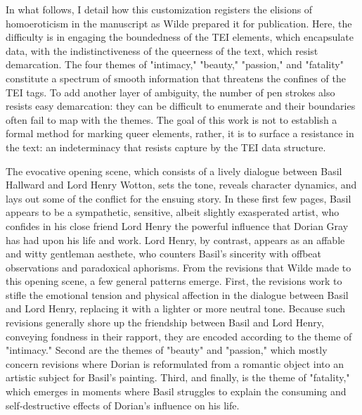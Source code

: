 \documentclass[11pt]{article}
\begin{document}
In what follows, I detail how this customization registers the
elisions of homoeroticism in the manuscript as Wilde prepared it for
publication. Here, the difficulty is in engaging the boundedness of
the TEI elements, which encapsulate data, with the indistinctiveness
of the queerness of the text, which resist demarcation. The four
themes of "intimacy," "beauty," "passion," and "fatality" constitute a
spectrum of smooth information that threatens the confines of the TEI
tags. To add another layer of ambiguity, the number of pen strokes
also resists easy demarcation: they can be difficult to enumerate and
their boundaries often fail to map with the themes. The goal of this
work is not to establish a formal method for marking queer elements,
rather, it is to surface a resistance in the text: an indeterminacy
that resists capture by the TEI data structure.

The evocative opening scene, which consists of a lively dialogue
between Basil Hallward and Lord Henry Wotton, sets the tone, reveals
character dynamics, and lays out some of the conflict for the ensuing
story. In these first few pages, Basil appears to be a sympathetic,
sensitive, albeit slightly exasperated artist, who confides in his
close friend Lord Henry the powerful influence that Dorian Gray has
had upon his life and work. Lord Henry, by contrast, appears as an
affable and witty gentleman aesthete, who counters Basil's sincerity
with offbeat observations and paradoxical aphorisms. From the
revisions that Wilde made to this opening scene, a few general
patterns emerge. First, the revisions work to stifle the emotional
tension and physical affection in the dialogue between Basil and Lord
Henry, replacing it with a lighter or more neutral tone. Because such
revisions generally shore up the friendship between Basil and Lord
Henry, conveying fondness in their rapport, they are encoded according
to the theme of "intimacy." Second are the themes of "beauty" and
"passion," which mostly concern revisions where Dorian is reformulated
from a romantic object into an artistic subject for Basil's
painting. Third, and finally, is the theme of "fatality," which
emerges in moments where Basil struggles to explain the consuming and
self-destructive effects of Dorian's influence on his life.
\end{document}
